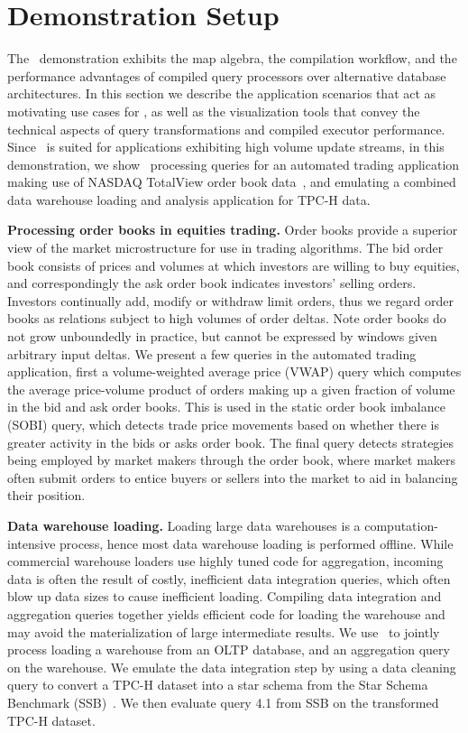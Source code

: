 
\section{Demonstration Setup}
The \compiler\ demonstration exhibits the map algebra, the compilation workflow,
and the performance advantages of compiled query processors over alternative
database architectures. In this section we describe the application scenarios
that act as motivating use cases for \compiler, as well as the visualization
tools that convey the technical aspects of query transformations and compiled
executor performance.
Since \compiler\ is suited for applications exhibiting high volume update
streams, in this demonstration, we show \compiler\ processing queries for an
automated trading application making use of NASDAQ TotalView order book
data~\cite{totalview-url}, and emulating a combined data warehouse loading and
analysis application for TPC-H data. 

\smallskip
\noindent\textbf{Processing order books in equities trading.}
Order books provide a superior view of the market microstructure for use in
trading algorithms. The bid order book consists of prices and volumes at which
investors are willing to buy equities, and correspondingly the ask order book
indicates investors' selling orders.
Investors continually add, modify or withdraw limit orders, thus we regard order
books as relations subject to high volumes of order deltas. Note order books do
not grow unboundedly in practice, but cannot be expressed by windows given
arbitrary input deltas.
We present a few queries in the automated trading application, first a
volume-weighted average price (VWAP) query which computes the average
price-volume product of orders making up a given fraction of volume in the bid
and ask order books. This is used in the static order book imbalance (SOBI)
query, which detects trade price movements based on whether there is greater
activity in the bids or asks order book. The final query detects
strategies being employed by market makers through the order book, where market
makers often submit orders to entice buyers or sellers into the market to aid in
balancing their position.

\smallskip
\noindent\textbf{Data warehouse loading.}
Loading large data warehouses is a computation-intensive process, hence most data
warehouse loading is performed offline. While commercial warehouse loaders use
highly tuned code for aggregation, incoming data is often the result of costly,
inefficient data integration queries, which often blow up data sizes to cause
inefficient loading. Compiling data integration and aggregation queries together
yields efficient code for loading the warehouse and may avoid the
materialization of large intermediate results.
We use \compiler\ to jointly process loading a warehouse from an OLTP database,
and an aggregation query on the warehouse. We emulate the data integration step
by using a data cleaning query to convert a TPC-H dataset into a star schema from
the Star Schema Benchmark (SSB)~\cite{poneil-ssb:07}. We then evaluate query 4.1
from SSB on the transformed TPC-H dataset.

